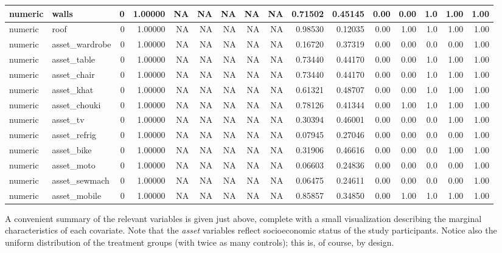 \documentclass[
  12pt, krantz2,
]{book}
\theoremstyle{definition}
\theoremstyle{definition}
\theoremstyle{definition}
\newcommand{\1}{\mathbbm{1}}
\begin{document}
\begin{tabular}{l|l|r|r|r|r|r|r|r|r|r|r|r|r|r|r}
\hline
numeric & walls & 0 & 1.00000 & NA & NA & NA & NA & NA & 0.71502 & 0.45145 & 0.00 & 0.00 & 1.0 & 1.00 & 1.00\\
\hline
numeric & roof & 0 & 1.00000 & NA & NA & NA & NA & NA & 0.98530 & 0.12035 & 0.00 & 1.00 & 1.0 & 1.00 & 1.00\\
\hline
numeric & asset\_wardrobe & 0 & 1.00000 & NA & NA & NA & NA & NA & 0.16720 & 0.37319 & 0.00 & 0.00 & 0.0 & 0.00 & 1.00\\
\hline
numeric & asset\_table & 0 & 1.00000 & NA & NA & NA & NA & NA & 0.73440 & 0.44170 & 0.00 & 0.00 & 1.0 & 1.00 & 1.00\\
\hline
numeric & asset\_chair & 0 & 1.00000 & NA & NA & NA & NA & NA & 0.73440 & 0.44170 & 0.00 & 0.00 & 1.0 & 1.00 & 1.00\\
\hline
numeric & asset\_khat & 0 & 1.00000 & NA & NA & NA & NA & NA & 0.61321 & 0.48707 & 0.00 & 0.00 & 1.0 & 1.00 & 1.00\\
\hline
numeric & asset\_chouki & 0 & 1.00000 & NA & NA & NA & NA & NA & 0.78126 & 0.41344 & 0.00 & 1.00 & 1.0 & 1.00 & 1.00\\
\hline
numeric & asset\_tv & 0 & 1.00000 & NA & NA & NA & NA & NA & 0.30394 & 0.46001 & 0.00 & 0.00 & 0.0 & 1.00 & 1.00\\
\hline
numeric & asset\_refrig & 0 & 1.00000 & NA & NA & NA & NA & NA & 0.07945 & 0.27046 & 0.00 & 0.00 & 0.0 & 0.00 & 1.00\\
\hline
numeric & asset\_bike & 0 & 1.00000 & NA & NA & NA & NA & NA & 0.31906 & 0.46616 & 0.00 & 0.00 & 0.0 & 1.00 & 1.00\\
\hline
numeric & asset\_moto & 0 & 1.00000 & NA & NA & NA & NA & NA & 0.06603 & 0.24836 & 0.00 & 0.00 & 0.0 & 0.00 & 1.00\\
\hline
numeric & asset\_sewmach & 0 & 1.00000 & NA & NA & NA & NA & NA & 0.06475 & 0.24611 & 0.00 & 0.00 & 0.0 & 0.00 & 1.00\\
\hline
numeric & asset\_mobile & 0 & 1.00000 & NA & NA & NA & NA & NA & 0.85857 & 0.34850 & 0.00 & 1.00 & 1.0 & 1.00 & 1.00\\
\hline
\end{tabular}

A convenient summary of the relevant variables is given just above, complete
with a small visualization describing the marginal characteristics of each
covariate. Note that the \emph{asset} variables reflect socioeconomic status of the
study participants. Notice also the uniform distribution of the treatment groups
(with twice as many controls); this is, of course, by design.
\end{document}

